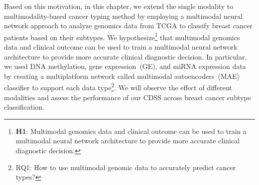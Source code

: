 \hspace*{3.5mm} Based on this motivation, in this chapter, we extend the single modality to multimodality-based cancer typing method by employing a multimodal neural network approach to analyze genomics data from TCGA to classify breast cancer patients based on their subtypes. We hypothesize\footnote{\textbf{H1}: Multimodal genomics data and clinical outcome can be used to train a multimodal neural network architecture to provide more accurate clinical diagnostic decision.} that multimodal genomics data and clinical outcome can be used to train a multimodal neural network architecture to provide more accurate clinical diagnostic decision.
In particular, we used DNA methylation, gene expression~(GE), and miRNA expression data by creating a multiplatform network called multimodal autoencoders~(MAE) classifier to support each data type\footnote{RQ1: How to use multimodal genomic data to accurately predict cancer
types?}. We will observe the effect of different modalities and assess the performance of our CDSS across breast cancer subtype classification. 

